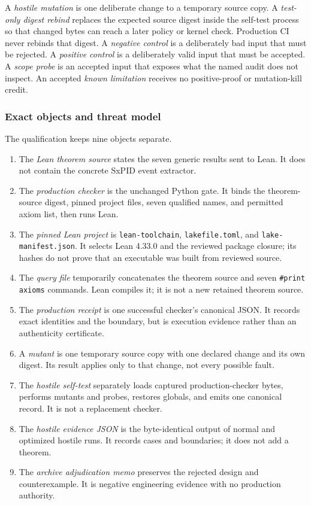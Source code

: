 \documentclass[11pt]{article}
\theoremstyle{definition}
\begin{document}
A \emph{hostile mutation} is one deliberate change to a temporary source copy.  A
\emph{test-only digest rebind} replaces the expected source digest inside the self-test process so
that changed bytes can reach a later policy or kernel check.  Production CI never rebinds that
digest.  A \emph{negative control} is a deliberately bad input that must be rejected.  A
\emph{positive control} is a deliberately valid input that must be accepted.  A \emph{scope
probe} is an accepted input that exposes what the named audit does not inspect.  An accepted
\emph{known limitation} receives no positive-proof or mutation-kill credit.

\subsubsection{Exact objects and threat model}

The qualification keeps nine objects separate.
\begin{enumerate}
  \item The \emph{Lean theorem source} states the seven generic results sent to Lean.  It does not
  contain the concrete SxPID event extractor.
  \item The \emph{production checker} is the unchanged Python gate.  It binds the theorem-source
  digest, pinned project files, seven qualified names, and permitted axiom list, then runs Lean.
  \item The \emph{pinned Lean project} is \texttt{lean-toolchain}, \texttt{lakefile.toml}, and
  \texttt{lake-manifest.json}.  It selects Lean 4.33.0 and the reviewed package closure; its hashes
  do not prove that an executable was built from reviewed source.
  \item The \emph{query file} temporarily concatenates the theorem source and seven
  \texttt{\#print axioms} commands.  Lean compiles it; it is not a new retained theorem source.
  \item The \emph{production receipt} is one successful checker's canonical JSON.  It records exact
  identities and the boundary, but is execution evidence rather than an authenticity certificate.
  \item A \emph{mutant} is one temporary source copy with one declared change and its own digest.
  Its result applies only to that change, not every possible fault.
  \item The \emph{hostile self-test} separately loads captured production-checker bytes, performs
  mutants and probes, restores globals, and emits one canonical record.  It is not a replacement
  checker.
  \item The \emph{hostile evidence JSON} is the byte-identical output of normal and optimized
  hostile runs.  It records cases and boundaries; it does not add a theorem.
  \item The \emph{archive adjudication memo} preserves the rejected design and counterexample.  It
  is negative engineering evidence with no production authority.
\end{enumerate}
\end{document}
